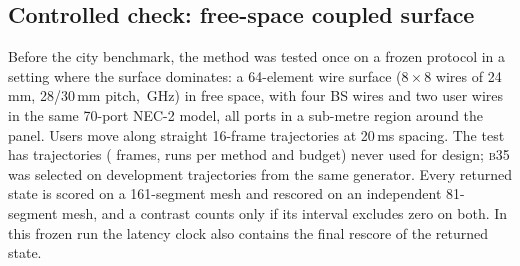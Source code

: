 \documentclass[runningheads]{llncs}
\newcommand{\bts}{\textsc{b35}}
\begin{document}
\subsection{Controlled check: free-space coupled surface}
Before the city benchmark, the method was tested once on a frozen protocol in a setting where the surface dominates: a 64-element wire surface ($8\times8$ wires of 24\,mm, 28/30\,mm pitch, \,GHz) in free space, with four BS wires and two user wires in the same 70-port NEC-2 model, all ports in a sub-metre region around the panel. Users move along straight 16-frame trajectories at 20\,ms spacing. The test has  trajectories ( frames,  runs per method and budget) never used for design; \bts{} was selected on development trajectories from the same generator. Every returned state is scored on a 161-segment mesh and rescored on an independent 81-segment mesh, and a contrast counts only if its interval excludes zero on both. In this frozen run the latency clock also contains the final rescore of the returned state.
\end{document}

